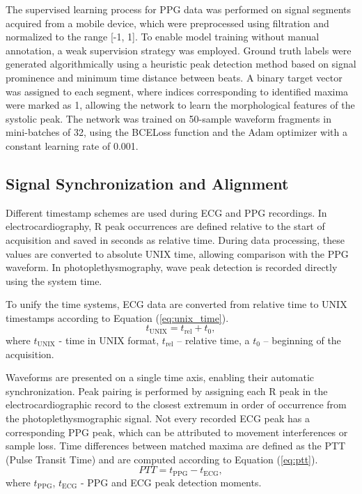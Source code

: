 \documentclass{citask}
\begin{document}
The supervised learning process for PPG data was performed on signal segments acquired from a mobile device, which were preprocessed using filtration and normalized to the range [-1, 1]. To enable model training without manual annotation, a weak supervision strategy was employed. Ground truth labels were generated algorithmically using a heuristic peak detection method based on signal prominence and minimum time distance between beats. A binary target vector was assigned to each segment, where indices corresponding to identified maxima were marked as 1, allowing the network to learn the morphological features of the systolic peak. The network was trained on 50-sample waveform fragments in mini-batches of 32, using the BCELoss function and the Adam optimizer with a constant learning rate of 0.001. 

\subsection{Signal Synchronization and Alignment}
Different timestamp schemes are used during ECG and PPG recordings. In electrocardiography, R peak occurrences are defined relative to the start of acquisition and saved in seconds as relative time. During data processing, these values are converted to absolute UNIX time, allowing comparison with the PPG waveform. In photoplethysmography, wave peak detection is recorded directly using the system time.

To unify the time systems, ECG data are converted from relative time to UNIX timestamps according to Equation (\ref{eq:unix_time}).
\begin{equation}
t_{\mathrm{UNIX}} = t_{\mathrm{rel}} + t_{0},
\label{eq:unix_time}
\end{equation}
where $t_{\mathrm{UNIX}}$ - time in UNIX format, $t_{\mathrm{rel}}$ – relative time, a $t_{0}$ – beginning of the acquisition.

Waveforms are presented on a single time axis, enabling their automatic synchronization. Peak pairing is performed by assigning each R peak in the electrocardiographic record to the closest extremum in order of occurrence from the photoplethysmographic signal. Not every recorded ECG peak has a corresponding PPG peak, which can be attributed to movement interferences or sample loss. Time differences between matched maxima are defined as the PTT (Pulse Transit Time) and are computed according to Equation (\ref{eq:ptt}).
\begin{equation}
PTT = t_{\mathrm{PPG}} - t_{\mathrm{ECG}},
\label{eq:ptt}
\end{equation}
where $t_{\mathrm{PPG}}$, $t_{\mathrm{ECG}}$ - PPG and ECG peak detection moments. 
\end{document}
